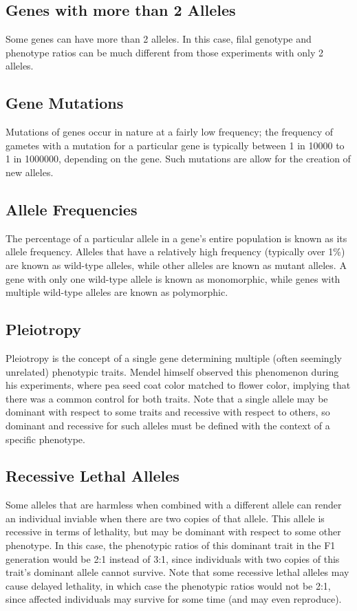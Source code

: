 \documentclass[12pt,titlepage]{article}
\begin{document}
    \subsection{Genes with more than 2 Alleles}
      Some genes can have more than 2 alleles. In this case, filal genotype and phenotype ratios can be much different from those experiments with only
      2 alleles.

    \subsection{Gene Mutations}
      Mutations of genes occur in nature at a fairly low frequency; the frequency of gametes with a mutation for a particular gene is typically between
      1 in 10000 to 1 in 1000000, depending on the gene. Such mutations are allow for the creation of new alleles.

    \subsection{Allele Frequencies}
      The percentage of a particular allele in a gene's entire population is known as its allele frequency. Alleles that have a relatively high frequency
      (typically over 1\%) are known as wild-type alleles, while other alleles are known as mutant alleles. A gene with only one wild-type allele is known
      as monomorphic, while genes with multiple wild-type alleles are known as polymorphic.

    \subsection{Pleiotropy}
      Pleiotropy is the concept of a single gene determining multiple (often seemingly unrelated) phenotypic traits. Mendel himself observed this phenomenon
      during his experiments, where pea seed coat color matched to flower color, implying that there was a common control for both traits. Note that a single
      allele may be dominant with respect to some traits and recessive with respect to others, so dominant and recessive for such alleles must be defined
      with the context of a specific phenotype.

    \subsection{Recessive Lethal Alleles}
      Some alleles that are harmless when combined with a different allele can render an individual inviable when there are two copies of that allele. This
      allele is recessive in terms of lethality, but may be dominant with respect to some other phenotype. In this case, the phenotypic ratios of this dominant
      trait in the F1 generation would be 2:1 instead of 3:1, since individuals with two copies of this trait's dominant allele cannot survive. Note that some
      recessive lethal alleles may cause delayed lethality, in which case the phenotypic ratios would not be 2:1, since affected individuals may survive for
      some time (and may even reproduce).
\end{document}
